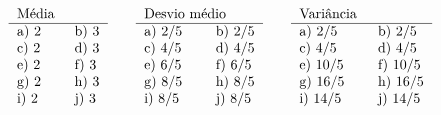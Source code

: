 \documentclass[oneside,12pt]{article}
\begin{document}
{{$
  \begin{tabular}{lll}
    \multicolumn{3}{l}{Média} \\
    \hline
    a) 2 && b) 3 \\
    c) 2 && d) 3 \\
    e) 2 && f) 3 \\
    g) 2 && h) 3 \\
    i) 2 && j) 3 \\
  \end{tabular}
  \qquad
  \begin{tabular}{lll}
    \multicolumn{3}{l}{Desvio médio} \\
    \hline
    a) 2/5 && b) 2/5 \\
    c) 4/5 && d) 4/5 \\
    e) 6/5 && f) 6/5 \\
    g) 8/5 && h) 8/5 \\
    i) 8/5 && j) 8/5 \\
  \end{tabular}
  \qquad
  \begin{tabular}{lll}
    \multicolumn{3}{l}{Variância} \\
    \hline
    a)  2/5 && b)  2/5 \\
    c)  4/5 && d)  4/5 \\
    e) 10/5 && f) 10/5 \\
    g) 16/5 && h) 16/5 \\
    i) 14/5 && j) 14/5 \\
  \end{tabular}
$


}}

\newpage

\end{document}
